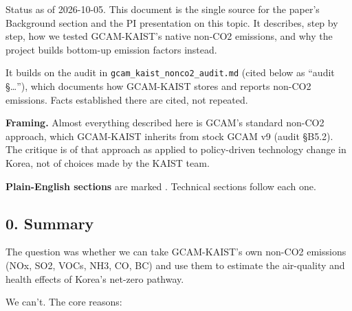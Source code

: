 Status as
of
2026-10-05.
This
document
is the
single
source for
the
paper's
Background
section
and the PI
presentation
on this
topic. It
describes,
step by
step, how
we tested
GCAM-KAIST's
native
non-CO2
emissions,
and why
the
project
builds
bottom-up
emission
factors
instead.

It builds
on the
audit in
{\texttt{gcam\_\allowbreak{}kaist\_\allowbreak{}nonco2\_\allowbreak{}audit.\allowbreak{}md}}
(cited
below as
``audit
§\ldots{}''),
which
documents
how
GCAM-KAIST
stores and
reports
non-CO2
emissions.
Facts
established
there are
cited, not
repeated.

\textbf{Framing.}
Almost
everything
described
here is
GCAM's
standard
non-CO2
approach,
which
GCAM-KAIST
inherits
from stock
GCAM v9
(audit
§B5.2).
The
critique
is of that
approach
as applied
to
policy-driven
technology
change in
Korea, not
of choices
made by
the KAIST
team.

\textbf{Plain-English
sections}
are marked
\plainmark{}.
Technical
sections
follow
each one.

\hypertarget{summary}{%
\subsection*{0. Summary \plainmark{}}\label{summary}}

The
question
was
whether we
can take
GCAM-KAIST's
own
non-CO2
emissions
(NOx, SO2,
VOCs, NH3,
CO, BC)
and use
them to
estimate
the
air-quality
and health
effects of
Korea's
net-zero
pathway.

We can't.
The core
reasons:

